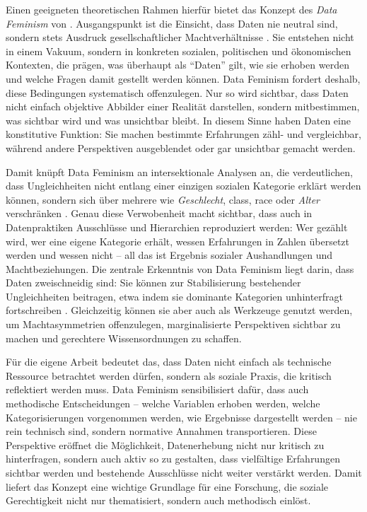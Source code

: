 Einen geeigneten theoretischen Rahmen hierfür bietet das Konzept des \textit{Data Feminism} von \textcite{dignazioDataFeminism2020}. Ausgangspunkt ist die Einsicht, dass Daten nie neutral sind, sondern stets Ausdruck gesellschaftlicher Machtverhältnisse \parencite[\gls{vgl}][\gls{s}~53ff.]{dignazioDataFeminism2020}. Sie entstehen nicht in einem Vakuum, sondern in konkreten sozialen, politischen und ökonomischen Kontexten, die prägen, was überhaupt als \enquote{Daten} gilt, wie sie erhoben werden und welche Fragen damit gestellt werden können. Data Feminism fordert deshalb, diese Bedingungen systematisch offenzulegen. Nur so wird sichtbar, dass Daten nicht einfach objektive Abbilder einer Realität darstellen, sondern mitbestimmen, was sichtbar wird und was unsichtbar bleibt. In diesem Sinne haben Daten eine konstitutive Funktion: Sie machen bestimmte Erfahrungen zähl- und vergleichbar, während andere Perspektiven ausgeblendet oder gar unsichtbar gemacht werden.

Damit knüpft Data Feminism an intersektionale Analysen an, die verdeutlichen, dass Ungleichheiten nicht entlang einer einzigen sozialen Kategorie erklärt werden können, sondern sich über mehrere  wie \emph{Geschlecht}, \gls{class}, \gls{race} oder \emph{Alter} verschränken \parencite[\gls{vgl}][\gls{s}~131ff.]{dignazioDataFeminism2020}. Genau diese Verwobenheit macht sichtbar, dass auch in Datenpraktiken Ausschlüsse und Hierarchien reproduziert werden: Wer gezählt wird, wer eine eigene Kategorie erhält, wessen Erfahrungen in Zahlen übersetzt werden und wessen nicht -- all das ist Ergebnis sozialer Aushandlungen und Machtbeziehungen. Die zentrale Erkenntnis von Data Feminism liegt darin, dass Daten zweischneidig sind: Sie können zur Stabilisierung bestehender Ungleichheiten beitragen, etwa indem sie dominante Kategorien unhinterfragt fortschreiben \parencite[\gls{vgl}][\gls{s}~27]{dignazioDataFeminism2020}. Gleichzeitig können sie aber auch als Werkzeuge genutzt werden, um Machtasymmetrien offenzulegen, marginalisierte Perspektiven sichtbar zu machen und gerechtere Wissensordnungen zu schaffen.

Für die eigene Arbeit bedeutet das, dass Daten nicht einfach als technische Ressource betrachtet werden dürfen, sondern als soziale Praxis, die kritisch reflektiert werden muss. Data Feminism sensibilisiert dafür, dass auch methodische Entscheidungen -- welche Variablen erhoben werden, welche Kategorisierungen vorgenommen werden, wie Ergebnisse dargestellt werden -- nie rein technisch sind, sondern normative Annahmen transportieren. Diese Perspektive eröffnet die Möglichkeit, Datenerhebung nicht nur kritisch zu hinterfragen, sondern auch aktiv so zu gestalten, dass vielfältige Erfahrungen sichtbar werden und bestehende Ausschlüsse nicht weiter verstärkt werden. Damit liefert das Konzept eine wichtige Grundlage für eine Forschung, die soziale Gerechtigkeit nicht nur thematisiert, sondern auch methodisch einlöst.

